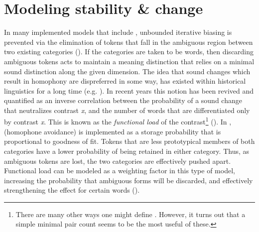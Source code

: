 \chapter{Modeling stability \& change}\label{ch:Models-of-Change}

In many implemented  models that include , unbounded
iterative biasing is prevented via the elimination of tokens that
fall in the ambiguous region between two existing categories (\citealt{Wedel2004,Wedel2006,Wedel2008,Blevins2009,DBLP:journals/corr/Tupper14a}).
If the categories are taken to be words, then discarding ambiguous
tokens acts to maintain a meaning distinction that relies on a minimal
sound distinction along the given  dimension. The idea that
sound changes which result in homophony are dispreferred in some way, 
has existed within historical linguistics for a long time (e.g. \citealt{Martinet1955}).
In recent years this notion has been revived and quantified as an
inverse correlation between the probability of a sound change that
neutralizes contrast \emph{x}, and the number of words that are differentiated
only by contrast \emph{x}. This is known as the \emph{functional load}
of the contrast\footnote{There are many other ways one might define . However,
it turns out that a simple minimal pair count seems to be the most
useful of these.} (\citealp{Surendran2006,wedel2013high}). In \citet{Wedel2008},
 (homophone avoidance) is implemented as a storage
probability that is proportional to goodness of fit. Tokens that are
less prototypical members of both categories have a lower probability
of being retained in either category. Thus, as ambiguous tokens are
lost, the two categories are effectively pushed apart. Functional
load can be modeled as a weighting factor in this type of model, increasing
the probability that ambiguous forms will be discarded, and effectively
strengthening the  effect for certain words (\citealt{Soskuthy2015}).

